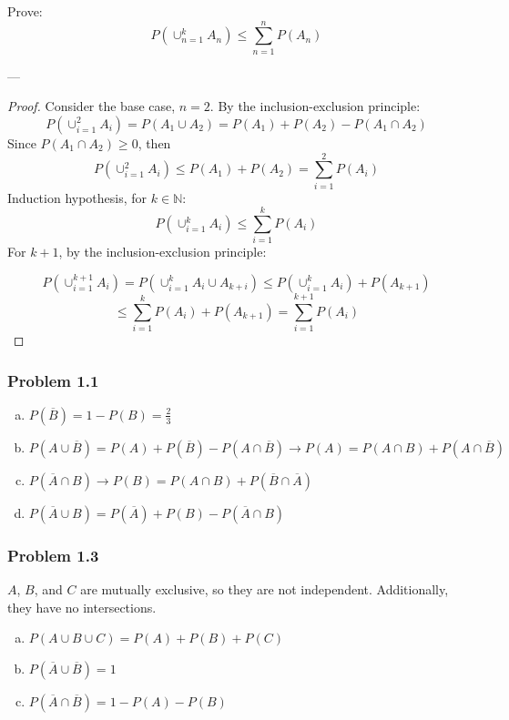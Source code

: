 \documentclass{report}
\begin{document}
Prove: $$P(\cup_{n=1}^k A_n) \leq \sum_{n=1}^{n} P(A_n)$$

---

\begin{proof}[Proof]

Consider the base case, $n=2$. By the inclusion-exclusion principle:
$$P(\cup_{i=1}^2 A_i) = P(A_1 \cup A_2) = P(A_1) + P(A_2) - P(A_1 \cap A_2)$$
Since $P(A_1 \cap A_2) \geq 0$, then  $$P(\cup_{i=1}^2 A_i) \leq P(A_1) + P(A_2) 
 = \sum_{i=1}^{2} P(A_i)$$
Induction hypothesis, for $k \in \mathbb{N}$: $$P(\cup_{i=1}^k A_i) \leq \sum_{i=1}^{k} P(A_i)$$
For $k+1$, by the inclusion-exclusion principle:


$$P ( \cup_{i=1}^{k+1} A_i ) = P(\cup^k_{i=1} A_i \cup A_{k+i}) \leq P(\cup_{i=1}^k A_i) + P(A_{k+1})$$ $$ \leq \sum_{i=1}^k P(A_i) + P(A_{k+1}) = \sum_{i=1}^{k+1} P(A_i) $$
  
\end{proof}

\subsubsection*{Problem 1.1}

\begin{enumerate}[(a)]

\item $P(\overline{B}) = 1 - P(B) = \frac{2}{3}$

\item $P(A \cup \overline{B}) = P(A) + P(\overline{B}) - P(A \cap \overline{B}) \rightarrow P(A) = P(A \cap B) + P(A \cap \overline{B})$

\item $P(\overline{A} \cap B) \rightarrow P(B) = P(A \cap B) + P(\overline{B} \cap \overline{A})$

\item $P(\overline{A} \cup B) = P(\overline{A}) + P(B) - P(\overline{A} \cap B)$

\end{enumerate}


\subsubsection*{Problem 1.3}

$A$, $B$, and $C$ are mutually exclusive, so they are not independent. Additionally, they have no intersections.


\begin{enumerate}[(a)]

\item $P(A \cup B \cup C) = P(A) + P(B) + P(C)$

\item $P(\overline{A} \cup \overline{B}) = 1$

\item $P(\overline{A} \cap \overline{B}) = 1 - P(A) - P(B)$ 


\end{enumerate}
\end{document}

